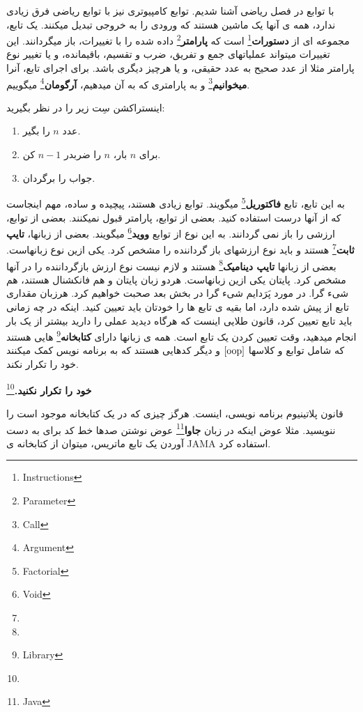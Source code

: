 \documentclass[14pt,a4paper]{memoir}
\begin{document}
با توابع در فصل ریاضی آشنا شدیم. توابع کامپیوتری نیز با توابع ریاضی فرق زیادی ندارد، همه ی آنها یک ماشین هستند که ورودی را به خروجی تبدیل میکنند. یک تابع، مجموعه ای از \textbf{دستورات}\footnote{Instructions} است که \textbf{پارامتر}\footnote{Parameter} داده شده را با تغییرات، باز میگردانند. این تغییرات میتواند عملیاتهای جمع و تفریق، ضرب و تقسیم، باقیمانده، و یا تغییر نوع پارامتر مثلا از عدد صحیح به عدد حقیقی، و یا هرچیز دیگری باشد. برای اجرای تابع، آنرا \textbf{میخوانیم}\footnote{Call} و به پارامتری که به آن میدهیم، \textbf{آرگومان}\footnote{Argument} میگوییم.

اینستراکشن سِت زیر را در نظر بگیرید:

\begin{enumerate}
	\item عدد $ n $ را بگیر.
	\item برای $ n $ بار، $ n $ را ضربدر $n - 1$ کن.
	\item جواب را برگردان.

\end{enumerate}

به این تابع، تابع \textbf{فاکتوریل}\footnote{Factorial} میگویند. توابع زیادی هستند، پیچیده و ساده، مهم اینجاست که از آنها درست استفاده کنید. 
بعضی از توابع، پارامتر قبول نمیکنند. بعضی از توابع، ارزشی را باز نمی گردانند. به این نوع از توابع \textbf{ووید}\footnote{Void} میگویند. بعضی از زبانها، \textbf{تایپ ثابت}\footnote{} هستند و باید نوع ارزشهای باز گرداننده را مشخص کرد.  یکی ازین نوع زبانهاست. بعضی از زبانها \textbf{تایپ دینامیک}\footnote{} هستند و لازم نیست نوع ارزش بازگرداننده را در آنها مشخص کرد. پایتان یکی ازین زبانهاست. هردو زبان پایتان و  هم فانکشنال هستند، هم شیء گرا. در مورد پَرَدایم شیء گرا در بخش بعد صحبت خواهیم کرد. 
هرزبان مقداری تابع از پیش  شده دارد، اما بقیه ی تابع ها را خودتان باید تعیین کنید. اینکه در چه زمانی باید تابع تعیین کرد، قانون طلایی اینست که هرگاه دیدید عملی را دارید بیشتر از یک بار انجام میدهید، وقت تعیین کردن یک تابع است. 
همه ی زبانها دارای \textbf{کتابخانه}\footnote{Library} هایی هستند که شامل توابع و کلاسها \(\ref{oop}\) و دیگر کدهایی هستند که به برنامه نویس کمک میکنند خود را تکرار نکند.
 
	 
	\textbf{خود را تکرار نکنید.}\footnote{}
	
	قانون پلاتینیوم برنامه نویسی، اینست. هرگز چیزی که در یک کتابخانه موجود است را ننویسید. مثلا عوض اینکه در زبان \textbf{جاوا}\footnote{Java} عوض نوشتن صدها خط کد برای به دست آوردن یک تابع ماتریس، میتوان از کتابخانه ی JAMA استفاده کرد.
	
\end{document}
